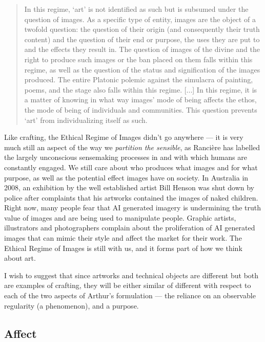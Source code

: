 \documentclass[letterpaper]{article}
\begin{document}
    \begin{quote}
        In this regime, ‘art’ is not identified as such but is subsumed under the question of images. As a specific type of entity, images are the object of a twofold question: the question of their origin (and consequently their truth content) and the question of their end or purpose, the uses they are put to and the effects they result in. The question of images of the divine and the right to produce such images or the ban placed on them falls within this regime, as well as the question of the status and signification of the images produced. The entire Platonic polemic against the simulacra of painting, poems, and the stage also falls within this regime. [...] In this regime, it is a matter of knowing in what way images' mode of being affects the ethos, the mode of being of individuals and communities. This question prevents ‘art’ from individualizing itself as such. \citep[pp.20-21]{RancierPltcsOfThAsthtcs2004}
    \end{quote}

    Like crafting, the Ethical Regime of Images didn't go anywhere — it is very much still an aspect of the way we \emph{partition the sensible}, as Rancière has labelled the largely unconscious sensemaking processes in and with which humans are constantly engaged. We still care about who produces what images and for what purpose, as well as the potential effect images have on society. In Australia in 2008, an exhibition by the well established artist Bill Henson was shut down by police after complaints that his artworks contained the images of naked children. Right now, many people fear that AI generated imagery is undermining the truth value of images and are being used to manipulate people. Graphic artists, illustrators and photographers complain about the proliferation of AI generated images that can mimic their style and affect the market for their work. The Ethical Regime of Images is still with us, and it forms part of how we think about art. 


    I wish to suggest that since artworks and technical objects are different but both are examples of crafting, they will be either similar of different with respect to each of the two aspects of Arthur's formulation — the reliance on an observable regularity (a phenomenon), and a purpose.


    \subsection{Affect}
\end{document}
